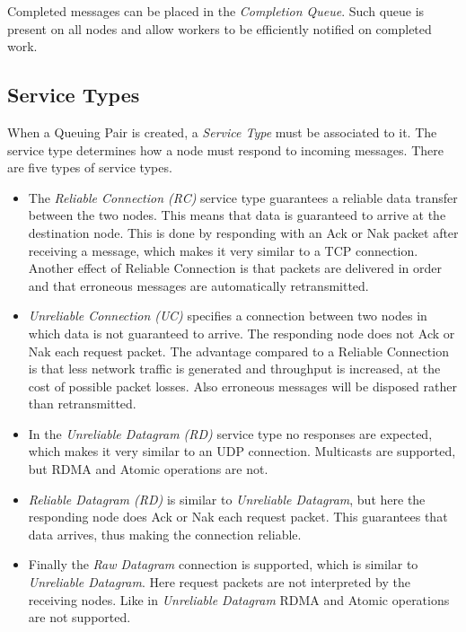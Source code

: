 Completed messages can be placed in the \emph{Completion Queue}. Such queue is present on all nodes and allow workers to be efficiently notified on completed work. 

\subsection{Service Types}
When a Queuing Pair is created, a \emph{Service Type} must be associated to it. The service type determines how a node must respond to incoming messages. There are five types of service types.

\begin{itemize}
	\item The \emph{Reliable Connection (RC)} service type guarantees a reliable data transfer between the two nodes. This means that data is guaranteed to arrive at the destination node. This is done by responding with an Ack or Nak packet after receiving a message, which makes it very similar to a TCP connection. Another effect of Reliable Connection is that packets are delivered in order and that erroneous messages are automatically retransmitted.

	\item \emph{Unreliable Connection (UC)} specifies a connection between two nodes in which data is not guaranteed to arrive. The responding node does not Ack or Nak each request packet. The advantage compared to a Reliable Connection is that less network traffic is generated and throughput is increased, at the cost of possible packet losses. Also erroneous messages will be disposed rather than retransmitted.

	\item In the \emph{Unreliable Datagram (RD)} service type no responses are expected, which makes it very similar to an UDP connection. Multicasts are supported, but RDMA and Atomic operations are not.

	\item \emph{Reliable Datagram (RD)} is similar to \emph{Unreliable Datagram}, but here the responding node does Ack or Nak each request packet. This guarantees that data arrives, thus making the connection reliable.

	\item Finally the \emph{Raw Datagram} connection is supported, which is similar to \emph{Unreliable Datagram}. Here request packets are not interpreted by the receiving nodes. Like in \emph{Unreliable Datagram} RDMA and Atomic operations are not supported. 
\end{itemize}

